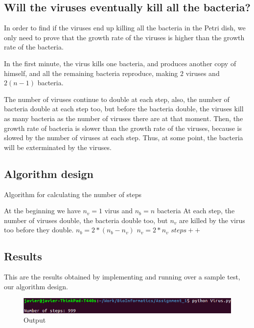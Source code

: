 \documentclass{article}
\begin{document}
\subsection*{Will the viruses eventually kill all the bacteria?}
In order to find if the viruses end up killing all the bacteria in the Petri dish, we only need to prove that the growth rate of the viruses is higher than the growth rate of the bacteria.

In the first minute, the virus kills one bacteria, and produces another copy of himself, and all the remaining bacteria reproduce, making $2$ viruses and $2(n-1)$ bacteria.

The number of viruses continue to double at each step, also, the number of bacteria double at each step too, but before the bacteria double, the viruses kill as many bacteria as the number of viruses there are at that moment. Then, the growth rate of bacteria is slower than the growth rate of the viruses, because is slowed by the number of viruses at each step. Thus, at some point, the bacteria will be exterminated by the viruses.

\subsection*{Algorithm design}

\begin{algorithm}[H]
\caption{Algorithm for calculating the number of steps}
\begin{algorithmic}[1]
\State At the beginning we have $n_v = 1$ virus and $n_b = n$ bacteria
\State At each step, the number of viruses double, the bacteria double too, but $n_v$ are killed by the virus too before they double.
 \State $n_b = 2*(n_b-n_v)$
 \State $n_v = 2*n_v$
 \State $steps++$
\EndWhile
\end{algorithmic}
\end{algorithm}

\subsection*{Results}

This are the results obtained by implementing and running over a sample test, our algorithm design.

\begin{figure}[H]
\begin{center}
\includegraphics[scale = .6]{output}
\end{center}
\caption{Output}
\end{figure}
\end{document}
